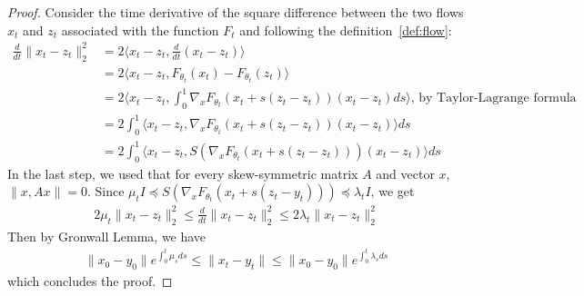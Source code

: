 \begin{proof}
  Consider the time derivative of the square difference between the two flows $x_t$ and $z_t$ associated with the function $F_t$ and following the definition~\ref{def:flow}: 
  \begin{align*}
    \frac{d}{dt} \lVert x_t-z_t\rVert_2^2 & = 2 \big\langle x_t-z_t,\frac{d}{dt}( x_t-z_t)\big\rangle\\
      &=2 \big\langle x_t-z_t,F_{\theta_{t}}(x_{t})-F_{\theta_{t}}(z_{t})\big\rangle \\
      &=  2 \big\langle x_t-z_t,\int_0^1\nabla_xF_{\theta_{t}}(x_{t}+s(z_t-z_t))(x_t-z_t)ds\big\rangle\textrm{, by Taylor-Lagrange formula}\\ 
      &=  2 \int_0^1\big\langle x_t-z_t,\nabla_xF_{\theta_{t}}(x_{t}+s(z_t-z_t))(x_t-z_t)\big\rangle ds\\
       &=  2 \int_0^1\big\langle x_t-z_t,S(\nabla_xF_{\theta_{t}}(x_{t}+s(z_t-z_t)))(x_t-z_t)\big\rangle ds
  \end{align*}
  In the last step, we used that for every skew-symmetric matrix $A$ and vector $x$, $\lVert x,Ax\rVert = 0$.
  Since $\mu_tI\preceq S(\nabla_xF_{\theta_{t}}(x_{t}+s(z_t-y_t)))\preceq  \lambda_tI$, we get
  \begin{align*}
   2\mu_t \lVert x_t-z_t\rVert_2^2 \leq \frac{d}{dt} \lVert x_t-z_t\rVert_2^2 \leq 2\lambda_t \lVert x_t-z_t\rVert_2^2
  \end{align*}
  Then by Gronwall Lemma, we have
  \begin{align*}
    \lVert x_0-y_0 \rVert e^{\int_0^t\mu_s ds}\leq \lVert x_t-y_t \rVert\leq \lVert x_0-y_0 \rVert e^{ \int_0^t\lambda_s ds}
  \end{align*}
  which concludes the proof.
  \end{proof}

